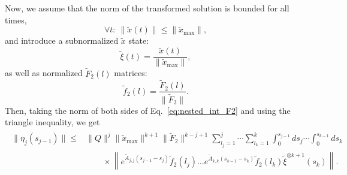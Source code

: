\documentclass[superscriptaddress,onecolumn,nofootinbib,longbibliography,a4paper,accepted=2026-09-29]{quantumarticle}
\theoremstyle{plain}
\theoremstyle{definition}
\numberwithin{thm}{section}
\numberwithin{assumption}{section}
\numberwithin{lemma}{section}
\numberwithin{prop}{section}
\numberwithin{cor}{section}
\numberwithin{definition}{section}
\numberwithin{rmk}{section}
\numberwithin{equation}{section}
\begin{document}
Now, we assume that the norm of the transformed solution is bounded for all times,
\begin{equation}
    \forall t:~ \|\tilde{x}(t)\| \leq \|\tilde{x}_{\mathrm{max}}\|,
\end{equation}
and introduce a subnormalized $\tilde{x}$ state:
\begin{equation}
    \tilde{\xi}(t) = \frac{\tilde{x}(t)}{\|\tilde{x}_{\mathrm{max}}\|},
\end{equation}
as well as normalized $\tilde{F}_2(l)$ matrices:
\begin{equation}
    \tilde{f}_2(l) = \frac{\tilde{F}_2(l)}{\|\tilde{F}_2\|}.
\end{equation}
Then, taking the norm of both sides of Eq.~\eqref{eq:nested_int_F2} and using the triangle inequality, we get
\begin{align}
\begin{split}
    \label{eq:error_cons_1}
    \|\eta_j(s_{j-1})\| \leq & \|Q\|^j \|\tilde{x}_{\mathrm{max}}\|^{k+1} \|\tilde{F}_2\|^{k-j+1}   \sum_{l_j=1}^{j} \cdots \sum_{l_k=1}^k \int_{0}^{s_{j-1}} ds_{j} \cdots \int_{0}^{s_{k-1}} ds_k \\ 
    &  \qquad\times \left\| e^{\tilde{A}_{j,j}(s_{j-1}-s_{j})} \tilde{f}_2(l_j)  \dots e^{\tilde{A}_{k,k}(s_{k-1}-s_k)} \tilde{f}_2(l_k) \tilde{\xi}^{\otimes k+1}(s_k)\right\|.
\end{split}
\end{align}
\end{document}
